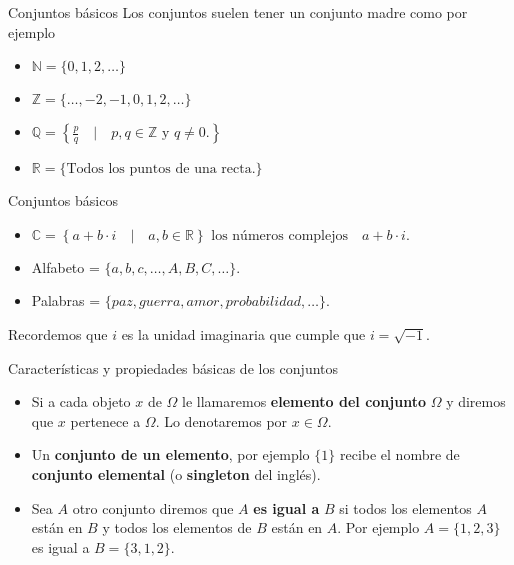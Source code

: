 \documentclass[
  ignorenonframetext,
  aspectratio=169]{beamer}
\providecommand{\tightlist}{%
  \setlength{\itemsep}{0pt}\setlength{\parskip}{0pt}}\usepackage{longtable,booktabs,array}
\begin{document}
\begin{frame}{Conjuntos básicos}
\protect\hypertarget{conjuntos-buxe1sicos}{}
Los conjuntos suelen tener un conjunto madre como por ejemplo

\begin{itemize}
\tightlist
\item
  \(\mathbb{N}=\{0,1,2,\ldots\}\)
\item
  \(\mathbb{Z}=\{\ldots,-2,-1,0,1,2,\ldots\}\)
\item
  \(\mathbb{Q}=\left\{\frac{p}{q}\quad\Big|\quad p,q\in \mathbb{Z} \mbox{ y } q \not= 0.\right\}\)
\item
  \(\mathbb{R}=\{\mbox{Todos los puntos de una recta.}\}\)
\end{itemize}
\end{frame}

\begin{frame}{Conjuntos básicos}
\protect\hypertarget{conjuntos-buxe1sicos-1}{}
\begin{itemize}
\tightlist
\item
  \(\mathbb{C}= \left\{a+b\cdot i\quad \big|\quad a,b\in \mathbb{R}\right\}\mbox{ los números complejos}\quad a+b\cdot i.\)
\item
  Alfabeto = \(\{a,b,c,\ldots, A,B,C,\ldots\}.\)
\item
  Palabras = \(\{paz, guerra, amor, probabilidad,\ldots\}.\)
\end{itemize}

Recordemos que \(i\) es la unidad imaginaria que cumple que
\(i=\sqrt{-1}\).
\end{frame}

\begin{frame}{Características y propiedades básicas de los conjuntos}
\protect\hypertarget{caracteruxedsticas-y-propiedades-buxe1sicas-de-los-conjuntos}{}
\begin{itemize}
\tightlist
\item
  Si a cada objeto \(x\) de \(\Omega\) le llamaremos \textbf{elemento
  del conjunto} \(\Omega\) y diremos que \(x\) pertenece a \(\Omega\).
  Lo denotaremos por \(x\in \Omega\).
\item
  Un \textbf{conjunto de un elemento}, por ejemplo \(\{1\}\) recibe el
  nombre de \textbf{conjunto elemental} (o \textbf{singleton} del
  inglés).
\item
  Sea \(A\) otro conjunto diremos que \(A\) \textbf{es igual a} \(B\) si
  todos los elementos \(A\) están en \(B\) y todos los elementos de
  \(B\) están en \(A\). Por ejemplo \(A=\{1,2,3\}\) es igual a
  \(B=\{3,1,2\}\).
\end{itemize}
\end{frame}
\end{document}
